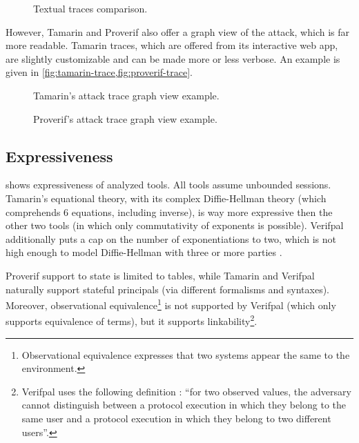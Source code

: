 \begin{figure}[t]
    \centering
    \caption{Textual traces comparison.}
    \label{fig:attack-trace}
\end{figure}

However, Tamarin and Proverif also offer a graph view of the attack, which is far more readable. Tamarin traces, which are offered from its interactive web app, are slightly customizable and can be made more or less verbose. An example is given in \cref{fig:tamarin-trace,fig:proverif-trace}.


\begin{figure}[t]
    \centering
    \caption{Tamarin's attack trace graph view example.}
    \label{fig:tamarin-trace}
\end{figure}
\begin{figure}[t]
    \centering
    \caption{Proverif's attack trace graph view example.}
    \label{fig:proverif-trace}
\end{figure}


\subsection{Expressiveness}
 shows expressiveness of analyzed tools.
All tools assume unbounded sessions. Tamarin's equational theory, with its complex Diffie-Hellman theory (which comprehends 6 equations, including inverse), is way more expressive then the other two tools (in which only commutativity of exponents is possible). Verifpal additionally puts a cap on the number of exponentiations to two, which is not high enough to model Diffie-Hellman with three or more parties \cite{MultipartyDH}.

Proverif support to state is limited to tables, while Tamarin and Verifpal naturally support stateful principals (via different formalisms and syntaxes). Moreover, observational equivalence\footnote{Observational equivalence expresses that two systems appear the same to the environment.} is not supported by Verifpal (which only supports equivalence of terms), but it supports linkability\footnote{Verifpal uses the following definition \cite{VerifpalFoundations}: ``for two
    observed values, the adversary cannot distinguish between a protocol execution in
    which they belong to the same user and a protocol execution in which they belong to
    two different users''.}.

